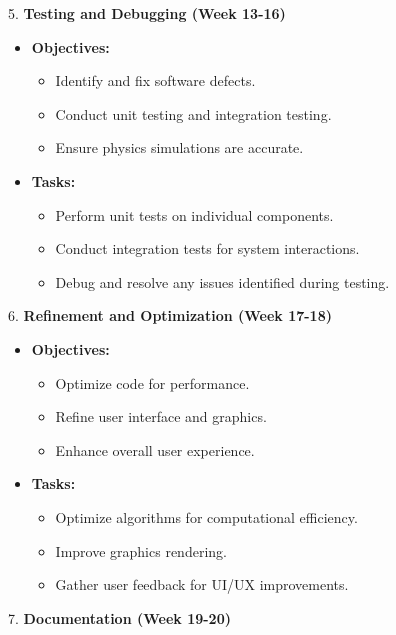 \documentclass[
]{article}
\begin{document}
5. \textbf{Testing and Debugging (Week 13-16)}

\begin{itemize}
\item
  \textbf{Objectives:}

  \begin{itemize}
  \item
    Identify and fix software defects.
  \item
    Conduct unit testing and integration testing.
  \item
    Ensure physics simulations are accurate.
  \end{itemize}
\item
  \textbf{Tasks:}

  \begin{itemize}
  \item
    Perform unit tests on individual components.
  \item
    Conduct integration tests for system interactions.
  \item
    Debug and resolve any issues identified during testing.
  \end{itemize}
\end{itemize}

6. \textbf{Refinement and Optimization (Week 17-18)}

\begin{itemize}
\item
  \textbf{Objectives:}

  \begin{itemize}
  \item
    Optimize code for performance.
  \item
    Refine user interface and graphics.
  \item
    Enhance overall user experience.
  \end{itemize}
\item
  \textbf{Tasks:}

  \begin{itemize}
  \item
    Optimize algorithms for computational efficiency.
  \item
    Improve graphics rendering.
  \item
    Gather user feedback for UI/UX improvements.
  \end{itemize}
\end{itemize}

7. \textbf{Documentation (Week 19-20)}
\end{document}
